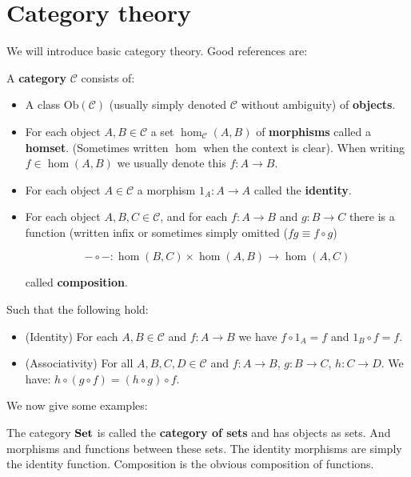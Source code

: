 

\section{Category theory}

We will introduce basic category theory. Good references are: \cite{MacLaneSaunders1998Cftw,rotman2008introduction}


\begin{defin}
	A {\bf category} $\mathcal{C}$ consists of:
	\begin{itemize}
		\item A class $\mathrm{Ob}(\mathcal{C})$ (usually simply denoted $\mathcal{C}$ without ambiguity) of {\bf objects}.
		\item For each object $A,B \in \mathcal{C}$ a set $\hom_{\mathcal{C}}(A,B)$ of {\bf morphisms} called a {\bf homset}. (Sometimes written $\hom$ when the context is clear). When writing $f \in \hom(A,B)$ we usually denote this $f : A \to B$.
		\item For each object $A \in \mathcal{C}$ a morphism $1_A : A \to A$ called the {\bf identity}.
		\item For each object $A,B,C \in \mathcal{C}$, and for each $f : A \to B$ and $g : B \to C$ there is a function (written infix or sometimes simply omitted ($fg \equiv f \circ g$)
		
		$$
			- \circ - : \hom(B,C) \times \hom(A,B) \to \hom(A,C)
		$$
		
		called {\bf composition}.
	\end{itemize}
	
	Such that the following hold:
	
	\begin{itemize}
		\item (Identity) For each $A,B \in \mathcal{C}$ and $f : A \to B$ we have $f \circ 1_A = f$ and $1_B \circ f = f$.
		\item (Associativity) For all $A,B,C,D \in \mathcal{C}$ and $f : A \to B$, $g : B \to C$, $h : C \to D$. We have: $h \circ (g \circ f) = (h \circ g) \circ f$.
	\end{itemize}
\end{defin}

We now give some examples:

\begin{example}
	The category ${\normalfont\textbf{Set}}$ is called the {\bf category of sets} and has objects as sets. And morphisms and functions between these sets. The identity morphisms are simply the identity function. Composition is the obvious composition of functions.
\end{example}

